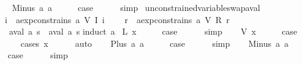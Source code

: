 \begin{isabellebody}
\isanewline
\ \ \isamarkupfalse%
\ {\isacharparenleft}Minus\ a{}\ a{}{\isacharparenright}\isanewline
\ \ \isamarkupfalse%
\ \isamarkupfalse%
\ {\isacharquery}case\isanewline
\ \ \ \ \isamarkupfalse%
\ simp\isanewline
{}\isamarkupfalse%
%
\endisatagproof
{\isafoldproof}%
%
\isadelimproof
\isanewline
%
\endisadelimproof
\isanewline
{}\isamarkupfalse%
\ unconstrained{\isacharunderscore}variable{\isacharunderscore}swap{\isacharunderscore}aval{\isacharcolon}\ \isanewline
\ \ {\isachardoublequoteopen}{\isasymforall}i{\isachardot}\ {\isasymnot}\ aexp{\isacharunderscore}constrains\ a\ {\isacharparenleft}V\ {\isacharparenleft}I\ i{\isacharparenright}{\isacharparenright}\ {\isasymLongrightarrow}\isanewline
\ \ \ {\isasymforall}r{\isachardot}\ {\isasymnot}\ aexp{\isacharunderscore}constrains\ a\ {\isacharparenleft}V\ {\isacharparenleft}R\ r{\isacharparenright}{\isacharparenright}\ {\isasymLongrightarrow}\isanewline
\ \ \ aval\ a\ s\ {\isacharequal}\ aval\ a\ s{\isacharprime}{\isachardoublequoteclose}\isanewline
%
\isadelimproof
%
\endisadelimproof
%
\isatagproof
{}\isamarkupfalse%
{\isacharparenleft}induct\ a{\isacharparenright}\isanewline
{}\isamarkupfalse%
\ {\isacharparenleft}L\ x{\isacharparenright}\isanewline
\ \ \isamarkupfalse%
\ \isamarkupfalse%
\ {\isacharquery}case\isanewline
\ \ \ \ \isamarkupfalse%
\ simp\isanewline
{}\isamarkupfalse%
\isanewline
\ \ \isamarkupfalse%
\ {\isacharparenleft}V\ x{\isacharparenright}\isanewline
\ \ \isamarkupfalse%
\ \isamarkupfalse%
\ {\isacharquery}case\isanewline
\ \ \ \ \isamarkupfalse%
\ {\isacharparenleft}cases\ x{\isacharparenright}\isanewline
\ \ \ \ \isamarkupfalse%
\ auto\isanewline
{}\isamarkupfalse%
\isanewline
\ \ \isamarkupfalse%
\ {\isacharparenleft}Plus\ a{}\ a{}{\isacharparenright}\isanewline
\ \ \isamarkupfalse%
\ \isamarkupfalse%
\ {\isacharquery}case\isanewline
\ \ \ \ \isamarkupfalse%
\ simp\isanewline
{}\isamarkupfalse%
\isanewline
\ \ \isamarkupfalse%
\ {\isacharparenleft}Minus\ a{}\ a{}{\isacharparenright}\isanewline
\ \ \isamarkupfalse%
\ \isamarkupfalse%
\ {\isacharquery}case\isanewline
\ \ \ \ \isamarkupfalse%
\ simp\isanewline
{}\isamarkupfalse%
%
\endisatagproof
{\isafoldproof}%
%
\isadelimproof
\isanewline
%
\endisadelimproof
%
\isadelimtheory
\isanewline
%
\endisadelimtheory
%
\isatagtheory
{}\isamarkupfalse%
%
\endisatagtheory
{\isafoldtheory}%
%
\isadelimtheory
%
\endisadelimtheory
%
\end{isabellebody}%
